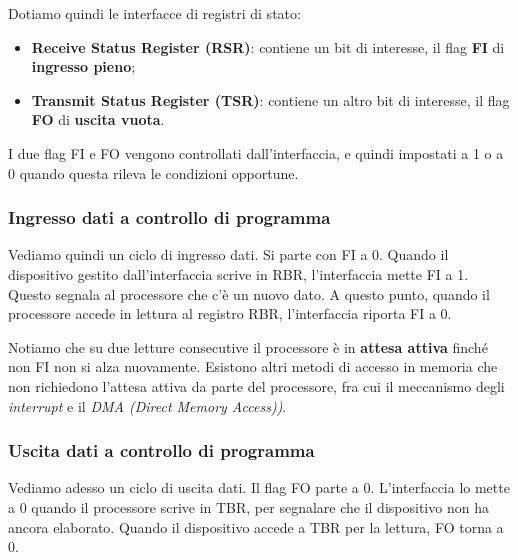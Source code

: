 \documentclass[a4paper,11pt]{article}
\begin{document}
\par\smallskip 

Dotiamo quindi le interfacce di registri di stato:
\begin{itemize}
	\item \textbf{Receive Status Register (RSR)}: contiene un bit di interesse, il flag \textbf{FI} di \textbf{ingresso pieno};
	\item \textbf{Transmit Status Register (TSR)}: contiene un altro bit di interesse, il flag \textbf{FO} di \textbf{uscita vuota}. 
\end{itemize}

I due flag FI e FO vengono controllati dall'interfaccia, e quindi impostati a 1 o a 0 quando questa rileva le condizioni opportune.

\subsubsection{Ingresso dati a controllo di programma}
Vediamo quindi un ciclo di ingresso dati.
Si parte con FI a 0.
Quando il dispositivo gestito dall'interfaccia scrive in RBR, l'interfaccia mette FI a 1. Questo segnala al processore che c'è un nuovo dato.
A questo punto, quando il processore accede in lettura al registro RBR, l'interfaccia riporta FI a 0.

Notiamo che su due letture consecutive il processore è in \textbf{attesa attiva} finché non FI non si alza nuovamente.
Esistono altri metodi di accesso in memoria che non richiedono l'attesa attiva da parte del processore, fra cui il meccanismo degli \textit{interrupt} e il \textit{DMA (Direct Memory Access))}.

\subsubsection{Uscita dati a controllo di programma}
Vediamo adesso un ciclo di uscita dati.
Il flag FO parte a 0.
L'interfaccia lo mette a 0 quando il processore scrive in TBR, per segnalare che il dispositivo non ha ancora elaborato.
Quando il dispositivo accede a TBR per la lettura, FO torna a 0.
\end{document}
